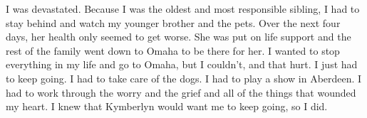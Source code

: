 \documentclass[12pt, letterpaper]{article}
\begin{document}
\begin{flushleft}
I was devastated.
Because I was the oldest and most responsible sibling,
I had to stay behind and watch my younger brother and the pets.
Over the next four days,
her health only seemed to get worse.
She was put on life support and the rest of the family
went down to Omaha to be there for her.
I wanted to stop everything in my life and go to Omaha,
but I couldn't, and that hurt.
I just had to keep going.
I had to take care of the dogs.
I had to play a show in Aberdeen.
I had to work through the worry and the grief and all of the things
that wounded my heart.
I knew that Kymberlyn would want me to keep going, so I did.
\vspace{5mm}









\end{flushleft}
\end{document}
